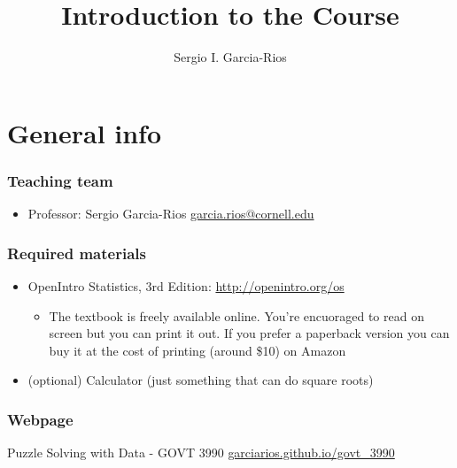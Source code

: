 \documentclass[11pt]{beamer}
\author{Sergio I. Garcia-Rios}
\title{Introduction to the Course}
\institute{Government 3990: Statistics in the Social Science}
\date{}
\begin{document}
\maketitle


\section{General info}


\begin{frame}
\frametitle{Teaching team}

\begin{itemize}

\item Professor: Sergio Garcia-Rios \url{garcia.rios@cornell.edu}


\end{itemize}

\end{frame}


\begin{frame}
\frametitle{Required materials}

\begin{itemize}

\item OpenIntro Statistics, 3rd Edition: \url{http://openintro.org/os}

\begin{itemize}
\item The textbook is freely available online. You’re encuoraged to read on screen but you can print it out. If you prefer a paperback version you can buy it at the cost of printing (around \$10) on Amazon
\end{itemize}

\item (optional) Calculator (just something that can do square roots)

\end{itemize}

\end{frame}


\begin{frame}
\frametitle{Webpage}


\centering
{\Large Puzzle Solving with Data - GOVT 3990
\url{garciarios.github.io/govt_3990} 
}

\end{frame}
\end{document}
